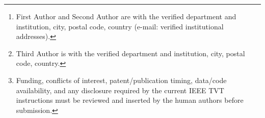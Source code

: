 \author{First~Author,~
        Second~Author,~
        and Third~Author%
\thanks{First Author and Second Author are with the verified department and
institution, city, postal code, country (e-mail: verified institutional
addresses).}%
\thanks{Third Author is with the verified department and institution, city,
postal code, country.}%
\thanks{Funding, conflicts of interest, patent/publication timing, data/code
availability, and any disclosure required by the current IEEE TVT instructions
must be reviewed and inserted by the human authors before submission.}}
